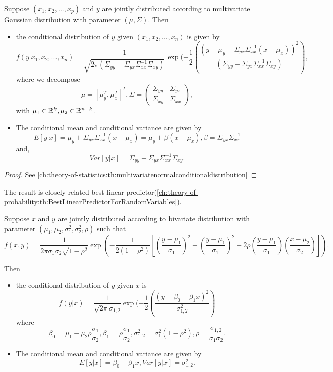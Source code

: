 \begin{refsection}
\begin{theorem}
Suppose $(x_1,x_2,...,x_p)$ and $y$ are jointly distributed	according to multivariate Gaussian distribution with parameter $(\mu,\Sigma)$.
Then 
\begin{itemize}
	\item the conditional distribution of $y$ given $(x_1,x_2,...,x_n)$ is given by	
		$$f(y|x_1,x_2,...,x_n)= \frac{1}{\sqrt{2\pi(\Sigma_{yy} - \Sigma_{yx}\Sigma_{xx}^{-1}\Sigma_{xy})}}\exp(-\frac{1}{2}(\frac{(y - \mu_y - \Sigma_{yx}\Sigma_{xx}^{-1}(x-\mu_x))^2}{(\Sigma_{yy} - \Sigma_{yx}\Sigma_{xx}^{-1}\Sigma_{xy})}),$$
	where we decompose $$\mu = [\mu_y^T ,\mu_x^T]^T,\Sigma = 
	\begin{pmatrix}
	\Sigma_{yy} & \Sigma_{yx} \\
	\Sigma_{xy} & \Sigma_{xx}
	\end{pmatrix}
	,$$ 
	with $\mu_1 \in \mathbb{R}^k,\mu_2\in \mathbb{R}^{n-k}$.
	\item The conditional mean and conditional variance are given by
	$$E[y|x] = \mu_y + \Sigma_{yx}\Sigma_{xx}^{-1}(x-\mu_x) = \mu_y + \beta(x - \mu_x),\beta = \Sigma_{yx}\Sigma_{xx}^{-1}$$
	and, $$Var[y|x]=\Sigma_{yy} - \Sigma_{yx}\Sigma_{xx}^{-1}\Sigma_{xy}.$$	
\end{itemize}
\end{theorem}
\begin{proof}
See 	
\autoref{ch:theory-of-statistics:th:multivariatenormalconditionaldistribution}
\end{proof}

\begin{remark}
The result is closely related best linear predictor(\autoref{ch:theory-of-probability:th:BestLinearPredictorForRandomVariables}). 	
\end{remark}


\begin{corollary}\cite[49]{montgomery2012introduction}
	Suppose $x$ and $y$ are jointly distributed	according to bivariate distribution with parameter $(\mu_1,\mu_2,\sigma^2_1,\sigma_2^2,\rho)$ such that
	$$f(x,y) = \frac{1}{2\pi \sigma_1\sigma_2 \sqrt{1-\rho^2}}\exp(-\frac{1}{2(1-\rho^2)}[(\frac{y-\mu_1}{\sigma_1})^2 + (\frac{y-\mu_1}{\sigma_1})^2 - 2\rho(\frac{y-\mu_1}{\sigma_1})(\frac{x-\mu_2}{\sigma_2})]). $$
	
	Then 
	\begin{itemize}
		\item the conditional distribution of $y$ given $x$ is	
		$$f(y|x) = \frac{1}{\sqrt{2\pi}\sigma_{1,2}}\exp(-\frac{1}{2}(\frac{(y-\beta_0-\beta_1x)^2}{\sigma_{1,2}^2})$$
		where
		$$\beta_0=\mu_1 - \mu_2\rho\frac{\sigma_1}{\sigma_2},\beta_1 = \rho\frac{\sigma_1}{\sigma_2}, \sigma_{1,2}^2=\sigma_1^2(1-\rho^2),\rho = \frac{\sigma_{1,2}}{\sigma_1\sigma_2}.$$
		\item The conditional mean and conditional variance are given by
		$$E[y|x] = \beta_0 + \beta_1x, Var[y|x]=\sigma_{1,2}^2.$$	
	\end{itemize}
\end{corollary}



\end{refsection}
